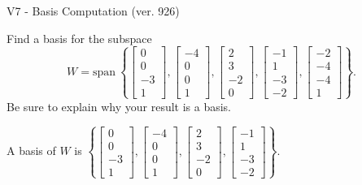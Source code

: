 \begin{exercise}
  \begin{exerciseTitle}V7 - Basis Computation (ver. 926)\end{exerciseTitle}
  \begin{exerciseStatement}
    Find a basis for the subspace 
\[W=\mathrm{span}\ \left\{\left[\begin{array}{r}
0 \\
0 \\
-3 \\
1
\end{array}\right] , \left[\begin{array}{r}
-4 \\
0 \\
0 \\
1
\end{array}\right] , \left[\begin{array}{r}
2 \\
3 \\
-2 \\
0
\end{array}\right] , \left[\begin{array}{r}
-1 \\
1 \\
-3 \\
-2
\end{array}\right] , \left[\begin{array}{r}
-2 \\
-4 \\
-4 \\
1
\end{array}\right]\right\}.\]
 Be sure to explain why your result is a basis.


  \end{exerciseStatement}
  \begin{exerciseAnswer}
   A basis of \(W\) is  \(\left\{\left[\begin{array}{r}
0 \\
0 \\
-3 \\
1
\end{array}\right] , \left[\begin{array}{r}
-4 \\
0 \\
0 \\
1
\end{array}\right] , \left[\begin{array}{r}
2 \\
3 \\
-2 \\
0
\end{array}\right] , \left[\begin{array}{r}
-1 \\
1 \\
-3 \\
-2
\end{array}\right]\right\}\).
  


  \end{exerciseAnswer}
\end{exercise}